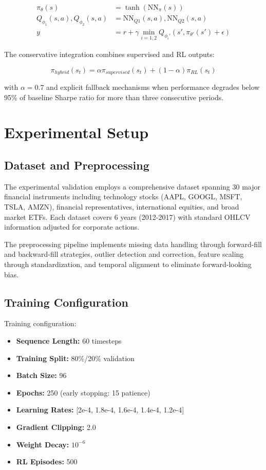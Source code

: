 \documentclass[10pt,twocolumn]{article}
\begin{document}
\begin{align}
\pi_{\theta}(s) &= \tanh(\text{NN}_{\pi}(s)) \\
Q_{\phi_1}(s,a), Q_{\phi_2}(s,a) &= \text{NN}_{Q1}(s,a), \text{NN}_{Q2}(s,a) \\
y &= r + \gamma \min_{i=1,2} Q_{\phi_i'}(s', \pi_{\theta'}(s') + \epsilon)
\end{align}

The conservative integration combines supervised and RL outputs:

\begin{equation}
\pi_{hybrid}(s_t) = \alpha \pi_{supervised}(s_t) + (1-\alpha) \pi_{RL}(s_t)
\end{equation}

with $\alpha = 0.7$ and explicit fallback mechanisms when performance degrades below 95\% of baseline Sharpe ratio for more than three consecutive periods.

\section{Experimental Setup}

\subsection{Dataset and Preprocessing}

The experimental validation employs a comprehensive dataset spanning 30 major financial instruments including technology stocks (AAPL, GOOGL, MSFT, TSLA, AMZN), financial representatives, international equities, and broad market ETFs. Each dataset covers 6 years (2012-2017) with standard OHLCV information adjusted for corporate actions.

The preprocessing pipeline implements missing data handling through forward-fill and backward-fill strategies, outlier detection and correction, feature scaling through standardization, and temporal alignment to eliminate forward-looking bias.

\subsection{Training Configuration}

Training configuration:
\begin{itemize}[itemsep=2pt, leftmargin=15pt]
\item \textbf{Sequence Length:} 60 timesteps
\item \textbf{Training Split:} 80\%/20\% validation
\item \textbf{Batch Size:} 96
\item \textbf{Epochs:} 250 (early stopping: 15 patience)
\item \textbf{Learning Rates:} [2e-4, 1.8e-4, 1.6e-4, 1.4e-4, 1.2e-4]
\item \textbf{Gradient Clipping:} 2.0
\item \textbf{Weight Decay:} $10^{-6}$
\item \textbf{RL Episodes:} 500
\end{itemize}
\end{document}

